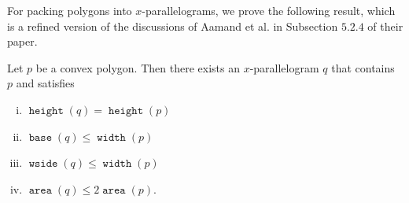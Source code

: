 \documentclass[a4paper,UKenglish,cleveref, autoref, thm-restate]{lipics_v2021}
\DeclareMathOperator{\area}{\mathtt{area}}
\DeclareMathOperator{\width}{\mathtt{width}}
\DeclareMathOperator{\height}{\mathtt{height}}
\DeclareMathOperator{\base}{\mathtt{base}}
\DeclareMathOperator{\wside}{\mathtt{wside}}
\begin{document}
For packing polygons into $x$-parallelograms, we prove the following result, which is a refined version of the discussions of Aamand et al. \cite{aamand_23} in Subsection $5.2.4$ of their paper.

\begin{lemma}
\label{polygon_into_parallelogram}
Let $p$ be a convex polygon. Then there exists an $x$-parallelogram $q$ that contains $p$ and satisfies
\begin{enumerate}[(i)]
    \item $\height(q) = \height(p)$
    \item $\base(q) \leq \width(p)$
    \item $\wside(q) \leq \width(p)$
    \item $\area(q) \leq 2 \area(p)$.
\end{enumerate}
\end{lemma}
\end{document}
